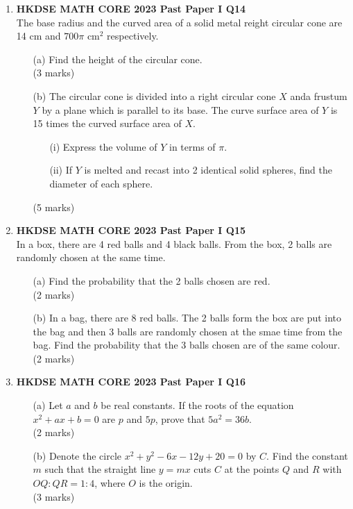\documentclass[12pt]{article}
\begin{document}
\begin{enumerate}
	\item \textbf{HKDSE MATH CORE 2023 Past Paper I Q14}\\
	The base radius and the curved area of a solid metal reight circular cone are 14 cm and $700\pi$ cm$^2$ respectively.
	\begin{enumerate}
		\item[(a)] Find the height of the circular cone. \\(3 marks)
		\item[(b)] The circular cone is divided into a right circular cone $X$ anda frustum $Y$ by a plane which is parallel to its base. The curve surface area of $Y$ is 15 times the curved surface area of $X$.
		\begin{enumerate}
			\item[(i)] Express the volume of $Y$ in terms of $\pi$.
			\item[(ii)] If $Y$ is melted and recast into 2 identical solid spheres, find the diameter of each sphere.
		\end{enumerate}
		(5 marks)
	\end{enumerate}

	\item \textbf{HKDSE MATH CORE 2023 Past Paper I Q15}\\
	In a box, there are 4 red balls and 4 black balls. From the box, 2 balls are randomly chosen at the same time.
	\begin{enumerate}
		\item[(a)] Find the probability that the 2 balls chosen are red. \\(2 marks)
		\item[(b)] In a bag, there are 8 red balls. The 2 balls form the box are put into the bag and then 3 balls are randomly chosen at the smae time from the bag. Find the probability that the 3 balls chosen are of the same colour. \\(2 marks)
	\end{enumerate}

	\item \textbf{HKDSE MATH CORE 2023 Past Paper I Q16}
	\begin{enumerate}
		\item[(a)] Let $a$ and $b$ be real constants. If the roots of the equation $x^2 + ax + b = 0$ are $p$ and $5p$, prove that $5a^2 = 36b$. \\(2 marks)
		\item[(b)] Denote the circle $x^2 + y^2 - 6x - 12y + 20 = 0$ by $C$. Find the constant $m$ such that the straight line $y = mx$ cuts $C$ at the points $Q$ and $R$ with $OQ:QR = 1:4$, where $O$ is the origin. \\(3 marks)
	\end{enumerate}


\end{enumerate}
\end{document}
